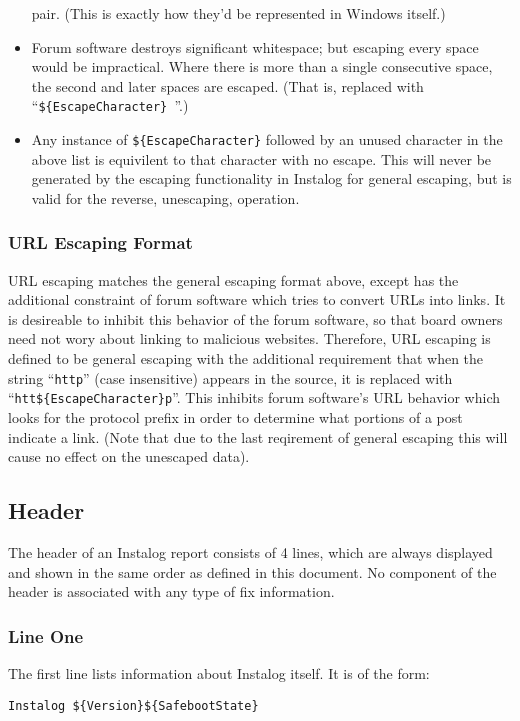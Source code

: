 \documentclass[letterpaper,12pt]{article}
\newcommand{\var}[1]{\texttt{\$\{#1\}}}
\begin{document}
\begin{itemize}
    pair. (This is exactly how they'd be represented in Windows itself.)
    \item Forum software destroys significant whitespace; but escaping every
    space would be impractical. Where there is more than a single consecutive
    space, the second and later spaces are escaped. (That is, replaced with
    ``\var{EscapeCharacter}\texttt{ }''.)
    \item Any instance of \var{EscapeCharacter} followed by an unused character
    in the above list is equivilent to that character with no escape. This will
    never be generated by the escaping functionality in Instalog for general
    escaping, but is valid for the reverse, unescaping, operation.
\end{itemize}

\subsubsection{URL Escaping Format} \label{urlescape}
URL escaping matches the general escaping format above, except has the
additional constraint of forum software which tries to convert URLs into links.
It is desireable to inhibit this behavior of the forum software, so that board
owners need not wory about linking to malicious websites. Therefore, URL
escaping is defined to be general escaping with the additional requirement that
when the string ``\texttt{http}'' (case insensitive) appears in the source, it
is replaced with ``\texttt{htt}\var{EscapeCharacter}\texttt{p}''. This inhibits
forum software's URL behavior which looks for the protocol prefix in order to
determine what portions of a post indicate a link. (Note that due to the last
reqirement of general escaping this will cause no effect on the unescaped data).

\subsection{Header}
The header of an Instalog report consists of 4 lines, which are always displayed
and shown in the same order as defined in this document. No component of the
header is associated with any type of fix information.

\subsubsection{Line One}
The first line lists information about Instalog itself. It is of the form:
\begin{verbatim}
Instalog ${Version}${SafebootState}
\end{verbatim}
\end{document}
